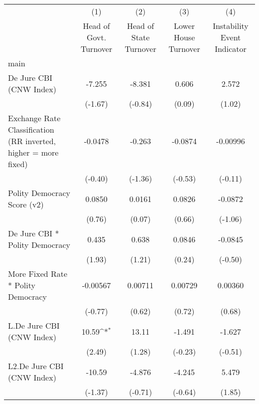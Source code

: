 {
\def\sym#1{\ifmmode^{#1}\else\(^{#1}\)\fi}
\begin{tabular}{l*{4}{c}}
\hline\hline
                &\multicolumn{1}{c}{(1)}&\multicolumn{1}{c}{(2)}&\multicolumn{1}{c}{(3)}&\multicolumn{1}{c}{(4)}\\
                &\multicolumn{1}{c}{Head of Govt. Turnover}&\multicolumn{1}{c}{Head of State Turnover}&\multicolumn{1}{c}{Lower House Turnover}&\multicolumn{1}{c}{Instability Event Indicator}\\
\hline
main            &                  &                  &                  &                  \\
De Jure CBI (CNW Index)&   -7.255         &   -8.381         &    0.606         &    2.572         \\
                &  (-1.67)         &  (-0.84)         &   (0.09)         &   (1.02)         \\
[1em]
Exchange Rate Classification (RR inverted, higher = more fixed)&  -0.0478         &   -0.263         &  -0.0874         & -0.00996         \\
                &  (-0.40)         &  (-1.36)         &  (-0.53)         &  (-0.11)         \\
[1em]
Polity Democracy Score (v2)&   0.0850         &   0.0161         &   0.0826         &  -0.0872         \\
                &   (0.76)         &   (0.07)         &   (0.66)         &  (-1.06)         \\
[1em]
De Jure CBI * Polity Democracy&    0.435         &    0.638         &   0.0846         &  -0.0845         \\
                &   (1.93)         &   (1.21)         &   (0.24)         &  (-0.50)         \\
[1em]
More Fixed Rate * Polity Democracy& -0.00567         &  0.00711         &  0.00729         &  0.00360         \\
                &  (-0.77)         &   (0.62)         &   (0.72)         &   (0.68)         \\
[1em]
L.De Jure CBI (CNW Index)&    10.59\sym{*}  &    13.11         &   -1.491         &   -1.627         \\
                &   (2.49)         &   (1.28)         &  (-0.23)         &  (-0.51)         \\
[1em]
L2.De Jure CBI (CNW Index)&   -10.59         &   -4.876         &   -4.245         &    5.479         \\
                &  (-1.37)         &  (-0.71)         &  (-0.64)         &   (1.85)         \\

\end{tabular}}
